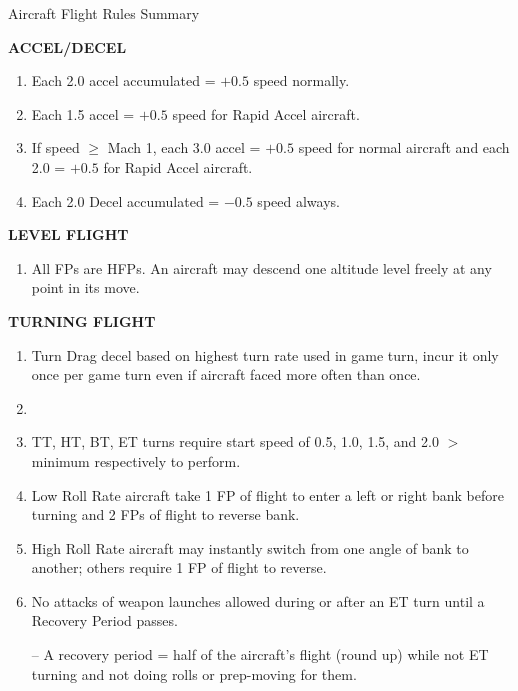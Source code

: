 \begin{table*}

\newcommand{\heading}[1]{\smallskip\textbf{\MakeUppercase{#1}}\par\smallskip}
\newcommand{\subheading}[1]{\smallskip\textbf{#1}\par\smallskip}

\caption{Aircraft Flight Rules Summary}
\medskip
\footnotesize
\begin{multicols}{2}

\heading{Accel/Decel}
\begin{enumerate}[nosep]
    \item Each 2.0 accel accumulated = $+0.5$ speed normally.
    \item Each 1.5 accel = $+0.5$ speed for Rapid Accel aircraft.
    \item If speed $\ge$ Mach 1, each 3.0 accel = $+0.5$ speed for normal aircraft and each 2.0 = $+0.5$ for Rapid Accel aircraft.
    \item Each 2.0 Decel accumulated = $-0.5$ speed always.
\end{enumerate}

\heading{Level Flight}
\begin{enumerate}[nosep]
    \item All FPs are HFPs. An aircraft may descend one altitude level freely at any point in its move.
\end{enumerate}

\heading{Turning Flight}
\begin{enumerate}[nosep]
    \item Turn Drag decel based on highest turn rate used in game turn, incur it only once per game turn even if aircraft faced more often than once.
    \item {}
    \item TT, HT, BT, ET turns require start speed of 0.5, 1.0, 1.5, and 2.0 $>$ minimum respectively to perform.
    \item Low Roll Rate aircraft take 1 FP of flight to enter a left or right bank before turning and 2 FPs of flight to reverse bank.
    \item High Roll Rate aircraft may instantly switch from one angle of bank to another; others require 1 FP of flight to reverse.
    \item No attacks of weapon launches allowed during or after an ET turn until a Recovery Period passes.
    \item[--] A recovery period = half of the aircraft's flight (round up) while not ET turning and not doing rolls or prep-moving for them.
\end{enumerate}


\end{multicols}
\end{table*}
